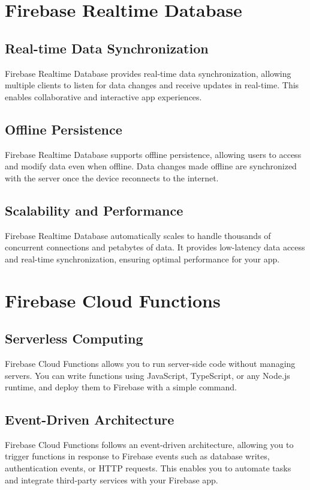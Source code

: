 \documentclass[12pt]{article}
\begin{document}
\section{Firebase Realtime Database}

\subsection{Real-time Data Synchronization}
Firebase Realtime Database provides real-time data synchronization, allowing multiple clients to listen for data changes and receive updates in real-time. This enables collaborative and interactive app experiences.

\subsection{Offline Persistence}
Firebase Realtime Database supports offline persistence, allowing users to access and modify data even when offline. Data changes made offline are synchronized with the server once the device reconnects to the internet.

\subsection{Scalability and Performance}
Firebase Realtime Database automatically scales to handle thousands of concurrent connections and petabytes of data. It provides low-latency data access and real-time synchronization, ensuring optimal performance for your app.

\section{Firebase Cloud Functions}

\subsection{Serverless Computing}
Firebase Cloud Functions allows you to run server-side code without managing servers. You can write functions using JavaScript, TypeScript, or any Node.js runtime, and deploy them to Firebase with a simple command.

\subsection{Event-Driven Architecture}
Firebase Cloud Functions follows an event-driven architecture, allowing you to trigger functions in response to Firebase events such as database writes, authentication events, or HTTP requests. This enables you to automate tasks and integrate third-party services with your Firebase app.
\end{document}
